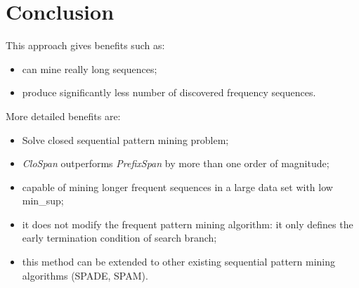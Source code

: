 \documentclass[journal]{IEEEtran}
\begin{document}
\section{Conclusion}
This approach gives benefits such as:
\begin{itemize}
  \item can mine really long sequences;
  \item produce significantly less number of discovered frequency sequences.
\end{itemize}

More detailed benefits are:
\begin{itemize}
\item Solve closed sequential pattern mining problem;
\item {\it CloSpan} outperforms {\it PrefixSpan} by more than one order of magnitude;
\item capable of mining longer frequent sequences in a large data set with low min\_sup;
\item it does not modify the frequent pattern mining algorithm: it only defines the early termination condition of search branch;
\item this method can be extended to other existing sequential pattern mining algorithms (SPADE, SPAM).
\end{itemize}



\end{document}
